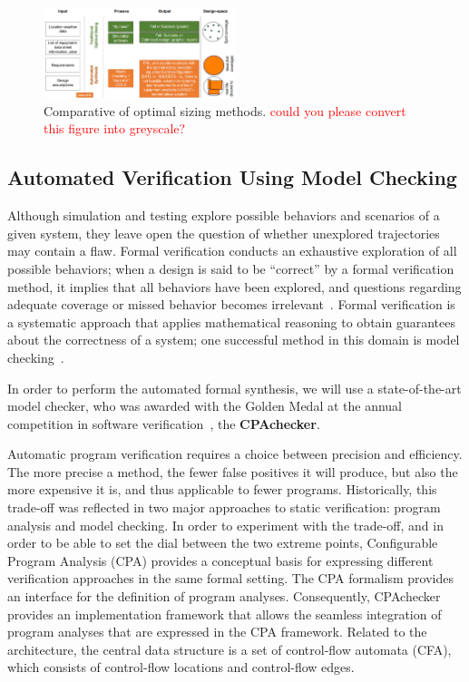 \documentclass[journal]{IEEEtran}
\begin{document}
\begin{figure}[h]
\includegraphics[width=0.5\textwidth]{optimalsizingprocess2}
\centering
\caption{Comparative of optimal sizing methods. \textcolor{red}{could you please convert this figure into greyscale?}}
\label{fig:optimization}
\end{figure}

\subsection{Automated Verification Using Model Checking}
\label{sec:AutomatedVerification}

Although simulation and testing explore possible behaviors and scenarios of a given system, 
they leave open the question of whether unexplored trajectories may contain a flaw. 
Formal verification conducts an exhaustive exploration of all possible behaviors; 
when a design is said to be ``correct'' by a formal verification method, it implies that all 
behaviors have been explored, and questions regarding adequate coverage or missed behavior 
becomes irrelevant~\cite{Clarke2012}. Formal verification is a systematic approach that 
applies mathematical reasoning to obtain guarantees about the correctness of a system; 
one successful method in this domain is model checking~\cite{Clarke2012}. 

In order to perform the automated formal synthesis, we will use a state-of-the-art model checker, who was awarded with the Golden Medal at the annual competition in software verification~\cite{LMU2019}, the \textbf{CPAchecker}.

Automatic program verification requires a choice between precision and efficiency. 
The more precise a method, the fewer false positives it will produce, but also the 
more expensive it is, and thus applicable to fewer programs. 
Historically, this trade-off was reflected in two major approaches to static verification: 
program analysis and model checking. In order to experiment with the trade-off, 
and in order to be able to set the dial between the two extreme points, 
Configurable Program Analysis (CPA) provides a conceptual basis for expressing 
different verification approaches in the same formal setting. The CPA formalism 
provides an interface for the definition of program analyses. Consequently, CPAchecker provides an implementation framework that allows the seamless integration of program analyses that are expressed in the CPA framework. Related to the architecture, the central data structure is a set of control-flow automata (CFA), which consists of control-flow locations and control-flow edges. 
\end{document}
